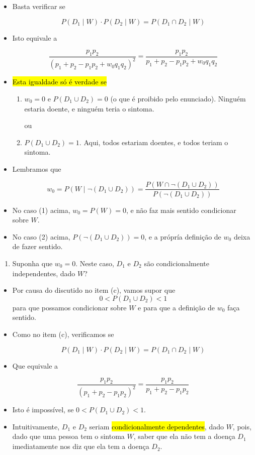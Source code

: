 \documentclass[
  11pt]{report}
\providecommand{\tightlist}{%
  \setlength{\itemsep}{0pt}\setlength{\parskip}{0pt}}
\begin{document}
\begin{itemize}
\item
  Basta verificar se

  \[
  P(D_1 \mid W) \cdot P(D_2 \mid W) = P(D_1 \cap D_2 \mid W)
  \]
\item
  Isto equivale a

  \[
  \frac{p_1p_2}{(p_1 + p_2 - p_1p_2 + w_0q_1q_2)^2} = 
  \frac{p_1p_2}{p_1 + p_2 - p_1p_2 + w_0q_1q_2}
  \]
\item
  {\hl{Esta igualdade só é verdade se}}

  \begin{enumerate}
  \def\labelenumi{\arabic{enumi}.}
  \item
    $w_0 = 0$ e $P(D_1 \cup D_2) = 0$ (o que é proibido pelo enunciado). Ninguém estaria doente, e ninguém teria o sintoma.

    ou
  \item
    $P(D_1 \cup D_2) = 1$. Aqui, todos estariam doentes, e todos teriam o sintoma.
  \end{enumerate}
\item
  Lembramos que

  \[
  w_0 = P(W \mid \neg(D_1 \cup D_2)) = 
  \frac{P(W \cap \neg(D_1 \cup D_2))}{P(\neg(D_1 \cup D_2))}
  \]
\item
  No caso (1) acima, $w_0 = P(W) = 0$, e não faz mais sentido condicionar sobre $W$.
\item
  No caso (2) acima, $P(\neg(D_1 \cup D_2)) = 0$, e a própría definição de $w_0$ deixa de fazer sentido.
\end{itemize}

\begin{rmdbox}

\begin{enumerate}
\def\labelenumi{\alph{enumi}.}
\setcounter{enumi}{3}
\tightlist
\item
  Suponha que $w_0 = 0$. Neste caso, $D_1$ e $D_2$ são condicionalmente independentes, dado $W$?
\end{enumerate}

\end{rmdbox}

\begin{itemize}
\item
  Por causa do discutido no item (c), vamos supor que \[0 < P(D_1 \cup D_2) < 1\] para que possamos condicionar sobre $W$ e para que a definição de $w_0$ faça sentido.
\item
  Como no item (c), verificamos se

  \[
  P(D_1 \mid W) \cdot P(D_2 \mid W) = P(D_1 \cap D_2 \mid W)
  \]
\item
  Que equivale a

  \[
  \frac{p_1p_2}{(p_1 + p_2 - p_1p_2)^2} = 
  \frac{p_1p_2}{p_1 + p_2 - p_1p_2}
  \]
\item
  Isto é impossível, se $0 < P(D_1 \cup D_2) < 1$.
\item
  Intuitivamente, $D_1$ e $D_2$ seriam {\hl{condicionalmente dependentes}}, dado $W$, pois, dado que uma pessoa tem o sintoma $W$, saber que ela não tem a doença $D_1$ imediatamente nos diz que ela tem a doença $D_2$.
\end{itemize}
\end{document}
